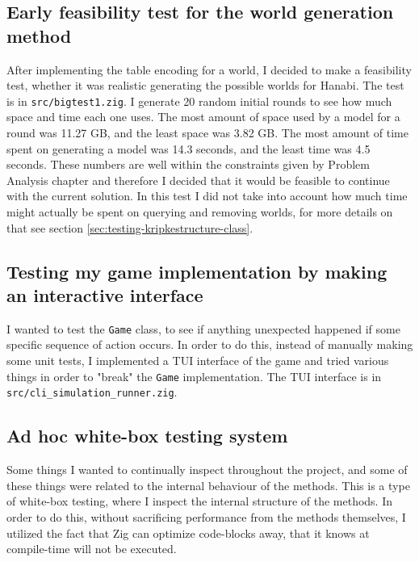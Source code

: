 \subsection{Early feasibility test for the world generation method}
After implementing the table encoding for a world, I decided to make a feasibility test, whether it was realistic generating the possible worlds for Hanabi.
The test is in {\tt src/bigtest1.zig}.
I generate 20 random initial rounds to see how much space and time each one uses. The most amount of space used by a model for a round was 11.27 GB, and the least space was 3.82 GB.
The most amount of time spent on generating a model was 14.3 seconds, and the least time was 4.5 seconds.
These numbers are well within the constraints given by Problem Analysis chapter and therefore I decided that it would be feasible to continue with the current solution.
In this test I did not take into account how much time might actually be spent on querying and removing worlds, for more details on that see section \ref{sec:testing-kripkestructure-class}.

\subsection{Testing my game implementation by making an interactive interface}
I wanted to test the {\tt Game} class, to see if anything unexpected happened if some specific sequence of action occurs.
In order to do this, instead of manually making some unit tests, I implemented a TUI interface of the game and tried various things in order to "break" the {\tt Game} implementation.
The TUI interface is in {\tt src/cli\_simulation\_runner.zig}.


\subsection{Ad hoc white-box testing system}
Some things I wanted to continually inspect throughout the project, and some of these things were related to the internal behaviour of the methods.
This is a type of white-box testing, where I inspect the internal structure of the methods.
In order to do this, without sacrificing performance from the methods themselves, I utilized the fact that Zig can optimize code-blocks away, that it knows at compile-time will not be executed.

